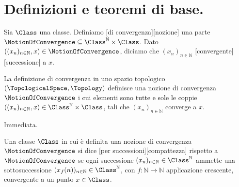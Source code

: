 \section{Definizioni e teoremi di base.}
\label{DefinizioniETeoremiDiBase}
\begin{Definition}
  Sia $\Class$ una classe. Definiamo
  [di convergenza][nozione]
  una parte
  $\NotionOfConvergence \subseteq \Class^\mathbb{N} \times \Class$.
  Dato
  $((x_n)_{n \in \mathbb{N}},x) \in \NotionOfConvergence$,
  diciamo che
  $(x_n)_{n \in \mathbb{N}}$
  [convergente][successione]
  a $x$.
\end{Definition}
\begin{Theorem}
  La definizione di convergenza in uno spazio topologico
  $(\TopologicalSpace,\Topology)$
  definisce una nozione di convergenza
  $\NotionOfConvergence$ i cui elementi sono tutte e sole le coppie
  $((x_n)_{n \in \mathbb{N}},x) \in \Class^\mathbb{N} \times \Class$,
  tali che
  $(x_n)_{n \in \mathbb{N}}$
  converge a $x$.
\end{Theorem}
\Proof Immediata. \EndProof
\begin{Definition}
  Una classe $\Class$ in cui \`e definita una nozione di convergenza
  $\NotionOfConvergence$ si dice
  [per successioni][compattezza]
  rispetto a $\NotionOfConvergence$
  se ogni successione
  $(x_n)_{n \in \mathbb{N}} \in \Class^\mathbb{N}$
  ammette una sottosuccessione
  $(x_f(n))_{n \in \mathbb{N}} \in \Class^\mathbb{N}$,
  con $f: \mathbb{N} \rightarrow \mathbb{N}$ applicazione crescente,
  convergente a un punto $x \in \Class$.
\end{Definition}
